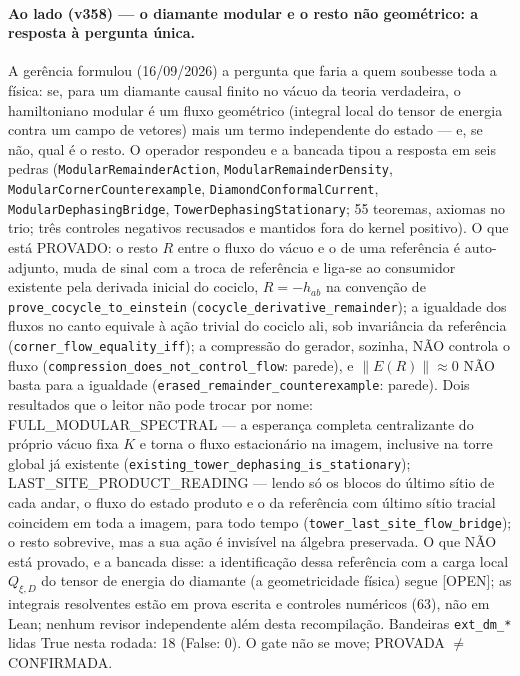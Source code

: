 \documentclass[11pt]{article}
\theoremstyle{definition}\newtheorem{deriv}{Derivação}
\begin{document}
\paragraph*{Ao lado (v358) --- o diamante modular e o resto não geométrico: a resposta à pergunta única.} A gerência formulou (16/09/2026) a pergunta que faria a quem soubesse toda a física: se, para um diamante causal finito no vácuo da teoria verdadeira, o hamiltoniano modular é um fluxo geométrico (integral local do tensor de energia contra um campo de vetores) mais um termo independente do estado --- e, se não, qual é o resto. O operador respondeu e a bancada tipou a resposta em seis pedras (\texttt{ModularRemainderAction}, \texttt{ModularRemainderDensity}, \texttt{ModularCornerCounterexample}, \texttt{DiamondConformalCurrent}, \texttt{ModularDephasingBridge}, \texttt{TowerDephasingStationary}; 55 teoremas, axiomas no trio; três controles negativos recusados e mantidos fora do kernel positivo). O que está PROVADO: o resto $R$ entre o fluxo do vácuo e o de uma referência é auto-adjunto, muda de sinal com a troca de referência e liga-se ao consumidor existente pela derivada inicial do cociclo, $R=-h_{ab}$ na convenção de \texttt{prove\_cocycle\_to\_einstein} (\texttt{cocycle\_derivative\_remainder}); a igualdade dos fluxos no canto equivale à ação trivial do cociclo ali, sob invariância da referência (\texttt{corner\_flow\_equality\_iff}); a compressão do gerador, sozinha, NÃO controla o fluxo (\texttt{compression\_does\_not\_control\_flow}: parede), e $\|E(R)\|\approx0$ NÃO basta para a igualdade (\texttt{erased\_remainder\_counterexample}: parede). Dois resultados que o leitor não pode trocar por nome: FULL\_MODULAR\_SPECTRAL --- a esperança completa centralizante do próprio vácuo fixa $K$ e torna o fluxo estacionário na imagem, inclusive na torre global já existente (\texttt{existing\_tower\_dephasing\_is\_stationary}); LAST\_SITE\_PRODUCT\_READING --- lendo só os blocos do último sítio de cada andar, o fluxo do estado produto e o da referência com último sítio tracial coincidem em toda a imagem, para todo tempo (\texttt{tower\_last\_site\_flow\_bridge}); o resto sobrevive, mas a sua ação é invisível na álgebra preservada. O que NÃO está provado, e a bancada disse: a identificação dessa referência com a carga local $Q_{\xi,D}$ do tensor de energia do diamante (a geometricidade física) segue [OPEN]; as integrais resolventes estão em prova escrita e controles numéricos (63), não em Lean; nenhum revisor independente além desta recompilação. Bandeiras \texttt{ext\_dm\_*} lidas True nesta rodada: 18 (False: 0). O gate não se move; PROVADA $\neq$ CONFIRMADA.
\end{document}

